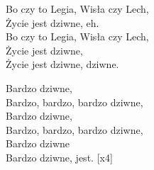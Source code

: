 \begin{text}
Bo czy to Legia, Wisła czy Lech,\\
Życie jest dziwne, eh.\\
Bo czy to Legia, Wisła czy Lech,\\
Życie jest dziwne,\\
Życie jest dziwne, dziwne.

Bardzo dziwne,\\
Bardzo, bardzo, bardzo dziwne,\\
Bardzo dziwne,\\
Bardzo, bardzo, bardzo dziwne,\\
Bardzo dziwne\\
Bardzo dziwne, jest. [x4]
\end{text}
\begin{chord}
\end{chord}